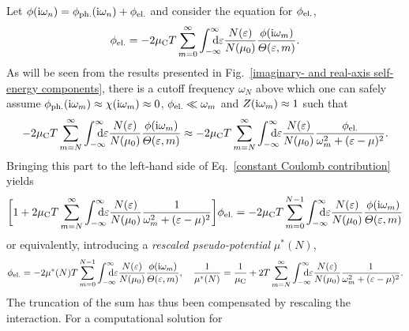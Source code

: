 Let $\phi(\mathrm i \omega_n) = \phi \sb{\text{ph.}} (\mathrm i \omega_n) + \phi \sb{\text{el.}}$ and
consider the  equation for $\phi \sb{\text{el.}}$,
%
\begin{equation} \label{constant Coulomb contribution}
    \phi \sub{el.} = -2 \mu \sub C T \sum_{m = 0}^\infty
    \int \from{-\infty} \till \infty \D \epsilon
    \frac{N(\epsilon)}{N(\mu_0)}
    \frac{\phi(\I \omega_m)}{\Theta(\epsilon, m)}.
\end{equation}
%
As will be seen from the results presented in Fig.~\ref{imaginary- and real-axis
self-energy components}, there is a cutoff frequency $\omega_N$ above which one
can safely assume $\phi \sb{\text{ph.}} (\mathrm i \omega_m) \approx \chi(\mathrm i \omega_m)
\approx 0$, $\phi \sb{\text{el.}} \ll \omega_m$ and $Z(\mathrm i \omega_m) \approx 1$ such
that
%
\begin{equation*}
    -2 \mu \sub C T \sum_{m = N}^\infty
    \int \from{-\infty} \till \infty \D \epsilon
    \frac{N(\epsilon)}{N(\mu_0)}
    \frac{\phi(\I \omega_m)}{\Theta(\epsilon, m)}
    \approx -2 \mu \sub C T \sum_{m = N}^\infty
    \int \from{-\infty} \till \infty \D \epsilon
    \frac{N(\epsilon)}{N(\mu_0)}
    \frac{\phi \sub{el.}}{\omega_m^2 + (\epsilon - \mu)^2}.
\end{equation*}
%
Bringing this part to the left-hand side of Eq.~\ref{constant Coulomb
contribution} yields
%
\begin{equation*}
    \bigg[
        1 + 2 \mu \sub C T \sum_{m = N}^\infty
        \int \from{-\infty} \till \infty \D \epsilon
        \frac{N(\epsilon)}{N(\mu_0)}
        \frac 1 {\omega_m^2 + (\epsilon - \mu)^2}
    \bigg]
    \phi \sub{el.} =
    -2 \mu \sub C T \sum_{m = 0}^{N - 1}
    \int \from{-\infty} \till \infty \D \epsilon
    \frac{N(\epsilon)}{N(\mu_0)}
    \frac{\phi(\I \omega_m)}{\Theta(\epsilon, m)}
\end{equation*}
%
or equivalently, introducing a \emph{rescaled  pseudo-potential}
$\mu^*(N)$,
%
\begin{equation*}
    \phi \sub{el.} =
    -2 \mu^*(N) T \sum_{m = 0}^{N - 1}
    \int \from{-\infty} \till \infty \D \epsilon
    \frac{N(\epsilon)}{N(\mu_0)}
    \frac{\phi(\I \omega_m)}{\Theta(\epsilon, m)},
    \quad
    \frac 1 {\mu^*(N)} = \frac 1 {\mu \sub C}
    + 2 T \sum_{m = N}^\infty
    \int \from{-\infty} \till \infty \D \epsilon
    \frac{N(\epsilon)}{N(\mu_0)}
    \frac 1 {\omega_m^2 + (\epsilon - \mu)^2}.
\end{equation*}
%
The truncation of the  sum has thus been compensated by
rescaling the  interaction. For a computational solution for
